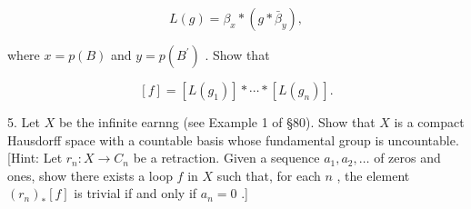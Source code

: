 \[
L\left( g\right)  = {\beta }_{x} * \left( {g * {\bar{\beta }}_{y}}\right) ,
\]

where \(x = p\left( B\right)\) and \(y = p\left( {B}^{\prime }\right)\) . Show that

\[
\left\lbrack  f\right\rbrack   = \left\lbrack  {L\left( {g}_{1}\right) }\right\rbrack   * \cdots  * \left\lbrack  {L\left( {g}_{n}\right) }\right\rbrack  .
\]

5. Let \(X\) be the infinite earnng (see Example 1 of  \S 80). Show that \(X\) is a compact Hausdorff space with a countable basis whose fundamental group is uncountable. [Hint: Let \({r}_{n} : X \rightarrow  {C}_{n}\) be a retraction. Given a sequence \({a}_{1},{a}_{2},\ldots\) of zeros and ones, show there exists a loop \(f\) in \(X\) such that, for each \(n\) , the element \({\left( {r}_{n}\right) }_{ * }\left\lbrack  f\right\rbrack\) is trivial if and only if \({a}_{n} = 0\) .]